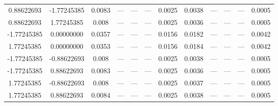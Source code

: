 \documentclass[a4paper,14pt]{extarticle}
\begin{document}
\begin{landscape}
\begin{table}[H]
\begin{tabular}{|c|c|*{5}{c}|*{5}{c}|}
 0.88622693        & -1.77245385        & 0.0083 & ---    & ---    & ---    & 0.0025 & 0.0038 & ---    & ---    & ---    & 0.0005 \\ 
 0.88622693        &  1.77245385        & 0.008  & ---    & ---    & ---    & 0.0025 & 0.0036 & ---    & ---    & ---    & 0.0005 \\ 
-1.77245385        &  0.00000000        & 0.0357 & ---    & ---    & ---    & 0.0156 & 0.0182 & ---    & ---    & ---    & 0.0042 \\ 
 1.77245385        &  0.00000000        & 0.0353 & ---    & ---    & ---    & 0.0156 & 0.0184 & ---    & ---    & ---    & 0.0042 \\ 
-1.77245385        & -0.88622693        & 0.008  & ---    & ---    & ---    & 0.0025 & 0.0038 & ---    & ---    & ---    & 0.0005 \\ 
-1.77245385        &  0.88622693        & 0.0083 & ---    & ---    & ---    & 0.0025 & 0.0036 & ---    & ---    & ---    & 0.0005 \\ 
 1.77245385        & -0.88622693        & 0.008  & ---    & ---    & ---    & 0.0025 & 0.0037 & ---    & ---    & ---    & 0.0005 \\ 
 1.77245385        &  0.88622693        & 0.0084 & ---    & ---    & ---    & 0.0025 & 0.0038 & ---    & ---    & ---    & 0.0005 \\ 
\hline                                   
\end{tabular}                            
\end{table} 


\end{landscape}
\end{document}
